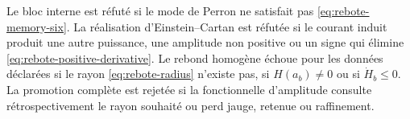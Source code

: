 \begin{falsifierbox}
Le bloc interne est réfuté si le mode de Perron ne satisfait pas
\cref{eq:rebote-memory-six}. La réalisation d'Einstein--Cartan est réfutée
si le courant induit produit une autre puissance, une amplitude non positive ou
un signe qui élimine \cref{eq:rebote-positive-derivative}. Le rebond
homogène échoue pour les données déclarées si le rayon
\cref{eq:rebote-radius} n'existe pas, si \(H(a_b)\ne0\) ou si \(\dot H_b\le0\). La
promotion complète est rejetée si la fonctionnelle d'amplitude consulte
rétrospectivement le rayon souhaité ou perd jauge, retenue ou raffinement.
\end{falsifierbox}
